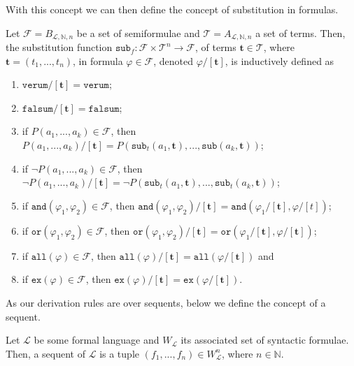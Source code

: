 With this concept we can then define the concept of substitution in formulas.

\begin{definition}[substitution]\label{def:subst}
    \leanok
    Let $\mathcal{F} = B_{\mathcal{L},\mathbb{N},n}$ be a set of semiformulae and $\mathcal{T} = A_{\mathcal{L},\mathbb{N},n}$ a set of terms. Then, the substitution function $\texttt{sub}_f : \mathcal{F} \times \mathcal{T}^{n} \to \mathcal{F}$, of terms $\textbf{t} \in \mathcal{T}$, where $\textbf{t} = (t_1,...,t_n)$, in formula $\varphi \in \mathcal{F}$, denoted $\varphi/[\textbf{t}]$, is inductively defined as
    \begin{enumerate}
        \item $\texttt{verum}/[\textbf{t}] = \texttt{verum}$;
        \item $\texttt{falsum}/[\textbf{t}] = \texttt{falsum}$;
        \item if $P(a_1,...,a_k) \in \mathcal{F}$, then $P(a_1,...,a_k)/[\textbf{t}] = P(\texttt{sub}_t(a_1,\textbf{t}),...,\texttt{sub}(a_k,\textbf{t}))$;
        \item if $\neg P(a_1,...,a_k) \in \mathcal{F}$, then $ \neg P(a_1,...,a_k)/[\textbf{t}] = \neg P(\texttt{sub}_t(a_1,\textbf{t}),...,\texttt{sub}_t(a_k,\textbf{t}))$;
        \item if $\texttt{and}(\varphi_1, \varphi_2) \in \mathcal{F}$, then $\texttt{and}(\varphi_1, \varphi_2)/[\textbf{t}] = \texttt{and}(\varphi_1/[\textbf{t}],\varphi/[t])$;
        \item if $\texttt{or}(\varphi_1, \varphi_2) \in \mathcal{F}$, then $\texttt{or}(\varphi_1, \varphi_2)/[\textbf{t}] = \texttt{or}(\varphi_1/[\textbf{t}],\varphi/[\textbf{t}])$;
        \item if $\texttt{all}(\varphi) \in \mathcal{F}$, then $\texttt{all}(\varphi)/[\textbf{t}] = \texttt{all}(\varphi/[\textbf{t}])$ and
        \item if $\texttt{ex}(\varphi)\in \mathcal{F}$, then $\texttt{ex}(\varphi)/[\textbf{t}] = \texttt{ex}(\varphi/[\textbf{t}])$.
    \end{enumerate}
\end{definition}

As our derivation rules are over sequents, below we define the concept of a sequent.

\begin{definition}[sequent]\label{def:seq}
    \leanok
    Let $\mathcal{L}$ be some formal language and $W_{\mathcal{L}}$ its associated set of syntactic formulae. Then, a sequent of $\mathcal{L}$ is a tuple $(f_1,...,f_n) \in W_{\mathcal{L}}^n$, where $n \in \mathbb{N}$.
\end{definition}

